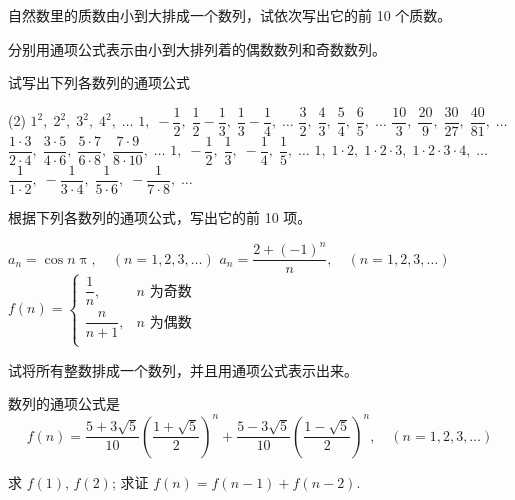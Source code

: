 \begin{Exercise}
\begin{question}
  \item 自然数里的质数由小到大排成一个数列，试依次写出它的前 10 个质数。
  \item 分别用通项公式表示由小到大排列着的偶数数列和奇数数列。
  \item 试写出下列各数列的通项公式
  \begin{tasks}(2)
    \task $1^2,\; 2^2,\; 3^2,\; 4^2,\; \ldots$
    \task $1,\; -\dfrac{1}{2},\; \dfrac{1}{2}-\dfrac{1}{3},\; \dfrac{1}{3}-\dfrac{1}{4},\; \ldots$
    \task $\dfrac{3}{2},\; \dfrac{4}{3},\; \dfrac{5}{4},\; \dfrac{6}{5},\; \ldots$
    \task $\dfrac{10}{3},\; \dfrac{20}{9},\; \dfrac{30}{27},\; \dfrac{40}{81},\; \ldots$
    \task $\dfrac{1\cdot 3}{2\cdot 4},\; \dfrac{3\cdot 5}{4\cdot 6},\; \dfrac{5\cdot 7}{6\cdot 8},\; \dfrac{7\cdot 9}{8\cdot 10},\; \ldots$
    \task $1,\; -\dfrac{1}{2},\; \dfrac{1}{3},\; -\dfrac{1}{4},\; \dfrac{1}{5},\; \ldots$
    \task $1,\; 1\cdot 2,\; 1\cdot 2\cdot 3,\; 1\cdot 2\cdot 3\cdot 4,\;\ldots $
    \task $\dfrac{1}{1\cdot 2},\; -\dfrac{1}{3\cdot 4},\; \dfrac{1}{5\cdot 6},\; -\dfrac{1}{7\cdot 8},\; \ldots$
  \end{tasks}
  \item 根据下列各数列的通项公式，写出它的前 10 项。
 \begin{tasks}%
    \task $a_n=\cos n\uppi,\quad (n=1,2,3,\ldots)$
    \task $a_n=\dfrac{2+(-1)^n}{n},\quad (n=1,2,3,\ldots)$
    \task $f(n)=\begin{cases}
        \dfrac{1}{n},& \text{$n$ 为奇数}\\
        \dfrac{n}{n+1},& \text{$n$ 为偶数}\\
    \end{cases}$
\end{tasks}       

\item 试将所有整数排成一个数列，并且用通项公式表示出来。
\item 数列的通项公式是
\[f(n)=\frac{5+3\sqrt{5}}{10}\left(\frac{1+\sqrt{5}}{2}\right)^n+\frac{5-3\sqrt{5}}{10}\left(\frac{1-\sqrt{5}}{2}\right)^n,\quad (n=1,2,3,\ldots)\]
\begin{tasks}
  \task 求 $f(1)$, $f(2)$;
  \task 求证 $f(n)=f(n-1)+f(n-2)$.
\end{tasks}


\end{question}
\end{Exercise}
